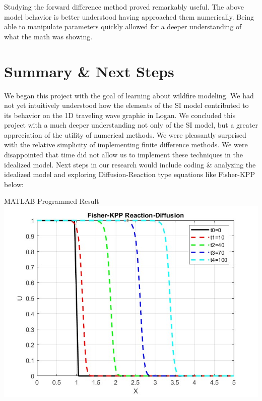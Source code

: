 \documentclass{article}
\begin{document}
Studying the forward difference method proved remarkably useful. The above model behavior is better understood having approached them numerically. Being able to manipulate parameters quickly allowed for a deeper understanding of what the math was showing.  
\clearpage    
\section{Summary \& Next Steps}
We began this project with the goal of learning about wildfire modeling.  We had not yet intuitively understood how the elements of the SI model contributed to its behavior on the 1D traveling wave graphic in Logan.  We concluded this project with a much deeper understanding not only of the SI model, but a greater appreciation of the utility of numerical methods. We were pleasantly surprised with the relative simplicity of implementing finite difference methods.  We were disappointed that time did not allow us to  implement these techniques in the idealized model.  Next steps in our research would include coding \& analyzing the idealized model and exploring  Diffusion-Reaction type equations like Fisher-KPP below:  
\vspace{1cm}\\
\begin{minipage}[t]{.49\textwidth}
    \centering
    MATLAB Programmed Result
    \includegraphics[scale=0.30]{HS_Reaction_Diffusion_5_timestamp.jpg}
    \captionsetup{justification=centering}
\end{minipage}
\end{document}

